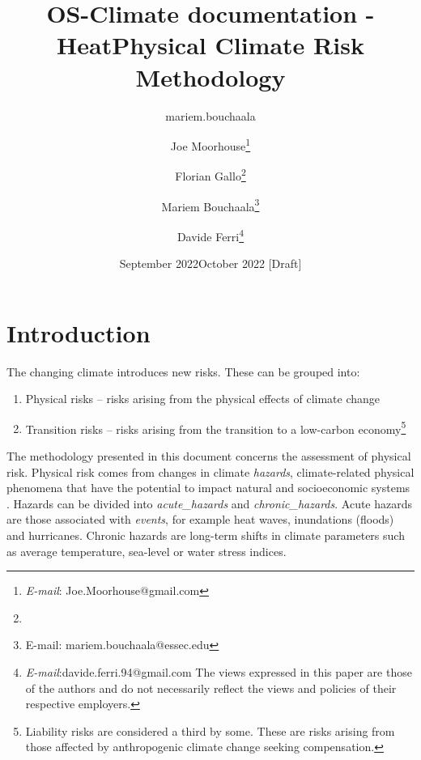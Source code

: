 \documentclass{article}
\title{OS-Climate documentation - Heat}
\author{mariem.bouchaala}
\date{September 2022}
\title{Physical Climate Risk Methodology}
\author{Joe Moorhouse\thanks{\textit{E-mail}: Joe.Moorhouse@gmail.com}
        \and
        Florian Gallo\thanks{}
        \and
        Mariem Bouchaala\thanks{{E-mail}: mariem.bouchaala@essec.edu}
        \and
        Davide Ferri\thanks{\textit{E-mail}:davide.ferri.94@gmail.com
        \smallskip
        \newline%
    The views expressed in this paper are those of the authors and do not necessarily reflect the views and policies of their respective employers.}
    }
\date{October 2022 [Draft]}
\begin{document}

\maketitle{}



\clearpage
\setcounter{tocdepth}{4}
\renewcommand{\contentsname}{Contents}
\tableofcontents




\clearpage
\section{Introduction}
\label{Sec:Introduction}

The changing climate introduces new risks. These can be grouped into:
\begin{enumerate}
	\item Physical risks -- risks arising from the physical effects of climate change
	\item Transition risks -- risks arising from the transition to a low-carbon economy\footnote{Liability risks are considered a third by some\cite{WoetzelEtAl:2020}. These are risks arising from those affected by anthropogenic climate change seeking compensation.}   
\end{enumerate}


The methodology presented in this document concerns the assessment of physical risk. Physical risk comes from changes in climate \emph{\gls{hazard}s}, climate-related physical phenomena that have the potential to impact natural and socioeconomic systems \cite{WoetzelEtAl:2020}\cite{MitchellEtAl:2017}. Hazards can be divided into \emph{\gls{acute_hazard}s} and \emph{\gls{chronic_hazard}s}. Acute hazards are those associated with \emph{events}, for example heat waves, inundations (floods) and hurricanes. Chronic hazards are long-term shifts in climate parameters such as average temperature, sea-level or water stress indices.  
\end{document}

